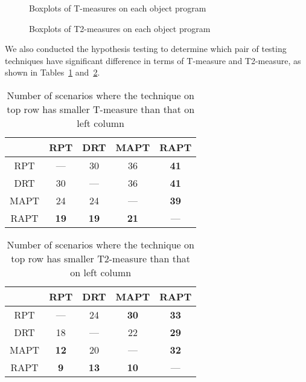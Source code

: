 \documentclass[10pt,journal,compsoc]{IEEEtran}
\begin{document}
\begin{figure*}[tp]
	\centering
	\caption{Boxplots of T-measures on each object program}
	\label{fig:Tmeasure}
\end{figure*}

\begin{figure*}[tp]
	\centering
	\caption{Boxplots of T2-measures on each object program}
	\label{fig:T2measure}
\end{figure*}

We also conducted the hypothesis testing to determine which pair of testing techniques have significant difference in terms of T-measure and T2-measure, as shown in Tables~\ref{tab:Tsta} and~\ref{tab:T2sta}.

\begin{table}
\caption{Number of scenarios where the technique on top row has smaller T-measure than that on left column}
\label{tab:Tsta}
\centering
\begin{tabular}{|c|c|c|c|c|} \hline
			& RPT					& DRT					& MAPT				& RAPT				\\ \hline
RPT		& ---					& 30					& 36					& \textbf{41}	\\ \hline
DRT		& 30					& ---					& 36					& \textbf{41}	\\ \hline
MAPT	& 24					& 24					& ---					& \textbf{39}	\\ \hline
RAPT	& \textbf{19}	& \textbf{19}	& \textbf{21}	& ---					\\ \hline
\end{tabular}
\end{table}

\begin{table}
\caption{Number of scenarios where the technique on top row has smaller T2-measure than that on left column}
\label{tab:T2sta}
\centering
\begin{tabular}{|c|c|c|c|c|} \hline
			& RPT					& DRT					& MAPT				& RAPT				\\ \hline
RPT		& ---					& 24					& \textbf{30}	& \textbf{33}	\\ \hline
DRT		& 18					& ---					& 22					& \textbf{29}	\\ \hline
MAPT	& \textbf{12}	& 20					& ---					& \textbf{32}	\\ \hline
RAPT	& \textbf{9}	& \textbf{13}	& \textbf{10}	& ---					\\ \hline
\end{tabular}
\end{table}
\end{document}
